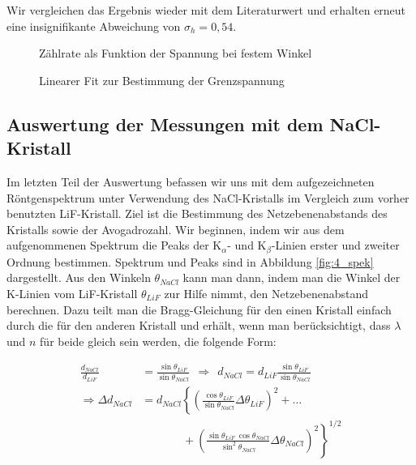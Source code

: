 \documentclass{article}
\begin{document}
Wir vergleichen das Ergebnis wieder mit dem Literaturwert und erhalten erneut eine insignifikante Abweichung von $\sigma_h = 0,54$.

\begin{figure}[!p]
    \centering
    \caption{Zählrate als Funktion der Spannung bei festem Winkel}
    \label{fig:3_mess}
\end{figure}

\begin{figure}[!p]
    \centering
    \caption{Linearer Fit zur Bestimmung der Grenzspannung}
    \label{fig:3_fit}
\end{figure}

\clearpage
\newpage

\subsection{Auswertung der Messungen mit dem NaCl-Kristall}

Im letzten Teil der Auswertung befassen wir uns mit dem aufgezeichneten Röntgenspektrum unter Verwendung des NaCl-Kristalls im Vergleich zum vorher benutzten LiF-Kristall. Ziel ist die Bestimmung des Netzebenenabstands des Kristalls sowie der Avogadrozahl. Wir beginnen, indem wir aus dem aufgenommenen Spektrum die Peaks der K$_\alpha$- und K$_\beta$-Linien erster und zweiter Ordnung bestimmen. Spektrum und Peaks sind in Abbildung \ref{fig:4_spek} dargestellt. Aus den Winkeln $\theta_{NaCl}$ kann man dann, indem man die Winkel der K-Linien vom LiF-Kristall $\theta_{LiF}$ zur Hilfe nimmt, den Netzebenenabstand berechnen. Dazu teilt man die Bragg-Gleichung für den einen Kristall einfach durch die für den anderen Kristall und erhält, wenn man berücksichtigt, dass $\lambda$ und $n$ für beide gleich sein werden, die folgende Form:

\begin{equation}
    \begin{split}
        \frac{d_{NaCl}}{d_{LiF}} &= \frac{\sin \theta_{LiF}}{\sin \theta_{NaCl}} \ \ \Rightarrow \ \ d_{NaCl} = d_{LiF} \frac{\sin \theta_{LiF}}{\sin \theta_{NaCl}} \\
        \Rightarrow \Delta d_{NaCl} &= d_{NaCl} \left\{ \left( \frac{\cos \theta_{LiF}}{\sin \theta_{NaCl}} \Delta \theta_{LiF} \right)^2 + \ldots \right. \\
        &\left. \phantom{.............} + \left( \frac{\sin \theta_{LiF} \ \cos \theta_{NaCl}}{\sin^2 \theta_{NaCl}} \Delta \theta_{NaCl} \right)^2 \right\}^{1/2}
    \end{split}
\end{equation}
\end{document}

